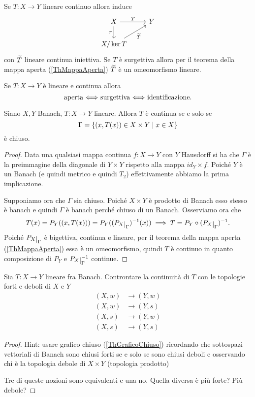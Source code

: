 \begin{remark}
Se $T:X\to Y$ lineare continuo allora induce
\[\begin{tikzcd}
	X & Y \\
	{X/\ker T}
	\arrow["T", from=1-1, to=1-2]
	\arrow["\pi"', from=1-1, to=2-1]
	\arrow["{\wt T}"', from=2-1, to=1-2]
\end{tikzcd}\]
con $\widetilde{T}$ lineare continua iniettiva. Se $T$ \`e surgettiva allora per il teorema della mappa aperta (\ref{ThMappaAperta}) $\widetilde{T}$ \`e un omeomorfismo lineare.
\end{remark}

\begin{remark}
Se $T:X\to Y$ \`e lineare e continua allora
\[\text{aperta $\Longleftrightarrow$ surgettiva $\Longleftrightarrow$ identificazione.}\]
\end{remark}

\begin{theorem}\label{ThGraficoChiuso}
Siano $X,Y$ Banach, $T:X\to Y$ lineare. Allora $T$ \`e continua se e solo se
\[\Gamma=\left\{{(x,T(x))\in X\times Y\mid x\in X}\right\}\]
\`e chiuso.
\end{theorem}
\begin{proof}
Data una qualsiasi mappa continua $f:X\to Y$ con $Y$ Hausdorff si ha che $\Gamma$ \`e la preimmagine della diagonale di $Y\times Y$ rispetto alla mappa $id_Y\times f$. Poich\'e $Y$ \`e un Banach (e quindi metrico e quindi $T_2$) effettivamente abbiamo la prima implicazione.
\smallskip

Supponiamo ora che $\Gamma$ sia chiuso. Poich\'e $X\times Y$ \`e prodotto di Banach esso stesso \`e banach e quindi $\Gamma$ \`e banach perch\'e chiuso di un Banach. Osserviamo ora che
\[T(x)=P_Y((x,T(x)))=P_Y((P_X\res{\Gamma})\ii(x))\implies T=P_Y\circ(P_X\res{\Gamma})\ii.\]
Poich\'e $P_X\res{\Gamma}$ \`e bigettiva, continua e lineare, per il teorema della mappa aperta (\ref{ThMappaAperta}) essa \`e un omeomorfismo, quindi $T$ \`e continuo in quanto composizione di $P_Y$ e $P_X\res{\Gamma}\ii$ continue.
\end{proof}

\begin{exercise}
Sia $T:X\to Y$ lineare fra Banach. Controntare la continuit\`a di $T$ con le topologie forti e deboli di $X$ e $Y$
\begin{align*}
(X,w)&\to (Y,w)\\
(X,w)&\to (Y,s)\\
(X,s)&\to (Y,w)\\
(X,s)&\to (Y,s)
\end{align*}
\end{exercise}
\begin{proof}
Hint: usare grafico chiuso (\ref{ThGraficoChiuso}) ricordando che sottospazi vettoriali di Banach sono chiusi forti se e solo se sono chiusi deboli e osservando chi \`e la topologia debole di $X\times Y$ (topologia prodotto)

Tre di queste nozioni sono equivalenti e una no. Quella diversa \`e pi\`u forte? Pi\`u debole?
\end{proof}


